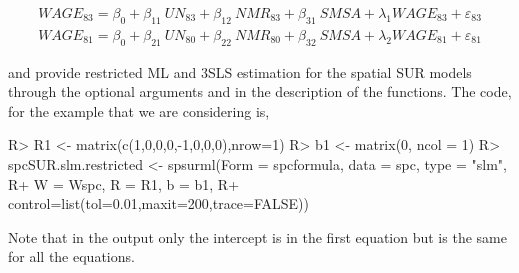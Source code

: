 \documentclass[article]{jss}
\begin{document}
\begin{equation}
\begin{array}{ll}
WAGE_{83} = \beta_{0} + \beta_{11} \ UN_{83} + \beta_{12} \  NMR_{83} + \beta_{31} \ SMSA + \lambda_{1} WAGE_{83} + \varepsilon_{83} \\
WAGE_{81} = \beta_{0} + \beta_{21} \ UN_{80} + \beta_{22} \ NMR_{80} + \beta_{32} \ SMSA +  \lambda_{2} WAGE_{81} + \varepsilon_{81}
\end{array}
\label{eq:AnselinR}
\end{equation}

 and  provide restricted ML and 3SLS estimation for the spatial SUR models through the optional arguments  and  in the description of the functions. The code, for the example that we are considering is,

\begin{CodeChunk}

\begin{CodeInput}
R> R1 <- matrix(c(1,0,0,0,-1,0,0,0),nrow=1)
R> b1 <- matrix(0, ncol = 1)
R> spcSUR.slm.restricted <- spsurml(Form = spcformula, data = spc, type = "slm",
R+                                 W = Wspc, R = R1, b = b1, 
R+                                 control=list(tol=0.01,maxit=200,trace=FALSE))
\end{CodeInput}
\end{CodeChunk}

Note that in the output only the intercept is in the first equation but is the same for all the equations.
\end{document}
